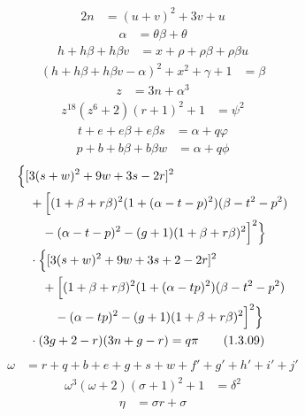 \documentclass[11pt,a4paper]{article}
\begin{document}
\begin{align}
2n&=(u+v)^2+3v+u \tag{1.3.01}\label{sys:01}
\end{align}
\begin{align}
\alpha&=\theta\beta+\theta \tag{1.3.02}\label{sys:02}
\end{align}
\begin{align}
h+h\beta+h\beta v&=x+\rho+\rho\beta+\rho\beta u \tag{1.3.03}\label{sys:03}
\end{align}
\begin{align}
(h+h\beta+h\beta v-\alpha)^2+x^2+\gamma+1&=\beta \tag{1.3.04}\label{sys:04}
\end{align}
\begin{align}
z&=3n+\alpha^3 \tag{1.3.05}\label{sys:05}
\end{align}
\begin{align}
z^{18}(z^6+2)(r+1)^2+1&=\psi^2 \tag{1.3.06}\label{sys:06}
\end{align}
\begin{align}
t+e+e\beta+e\beta s&=\alpha+q\varphi \tag{1.3.07}\label{sys:07}
\end{align}
\begin{align}
p+b+b\beta+b\beta w&=\alpha+q\phi \tag{1.3.08}\label{sys:08}
\end{align}
\begin{align}
&\Bigl\{[3(s+w)^2+9w+3s-2r]^2\notag\\
&\quad+\Bigl[(1+\beta+r\beta)^2(1+(\alpha-t-p)^2)(\beta-t^2-p^2)\notag\\
&\qquad-(\alpha-t-p)^2-(g+1)(1+\beta+r\beta)^2\Bigr]^2\Bigr\}\notag\\
&\quad\cdot\Bigl\{[3(s+w)^2+9w+3s+2-2r]^2\notag\\
&\qquad+\Bigl[(1+\beta+r\beta)^2(1+(\alpha-tp)^2)(\beta-t^2-p^2)\notag\\
&\qquad\quad-(\alpha-tp)^2-(g+1)(1+\beta+r\beta)^2\Bigr]^2\Bigr\}\notag\\
&\quad\cdot(3g+2-r)(3n+g-r)=q\pi \tag{1.3.09}\label{sys:09}
\end{align}
\begin{align}
\omega&=r+q+b+e+g+s+w+f'+g'+h'+i'+j' \tag{1.3.10}\label{sys:10}
\end{align}
\begin{align}
\omega^3(\omega+2)(\sigma+1)^2+1&=\delta^2 \tag{1.3.11}\label{sys:11}
\end{align}
\begin{align}
\eta&=\sigma r+\sigma \tag{1.3.12}\label{sys:12}
\end{align}
\end{document}
